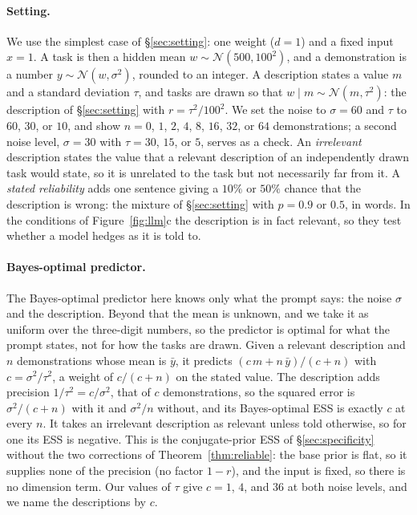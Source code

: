 \documentclass{article}
\begin{document}
\paragraph{Setting.} We use the simplest case of \S\ref{sec:setting}: one weight ($d = 1$) and a fixed input $x = 1$. A task is then a hidden mean $w \sim \mathcal{N}(500, 100^2)$, and a demonstration is a number $y \sim \mathcal{N}(w, \sigma^2)$, rounded to an integer. A description states a value $m$ and a standard deviation $\tau$, and tasks are drawn so that $w \mid m \sim \mathcal{N}(m, \tau^2)$: the description of \S\ref{sec:setting} with $r = \tau^2/100^2$. We set the noise to $\sigma = 60$ and $\tau$ to $60$, $30$, or $10$, and show $n = 0$, $1$, $2$, $4$, $8$, $16$, $32$, or $64$ demonstrations; a second noise level, $\sigma = 30$ with $\tau = 30$, $15$, or $5$, serves as a check. An \emph{irrelevant} description states the value that a relevant description of an independently drawn task would state, so it is unrelated to the task but not necessarily far from it. A \emph{stated reliability} adds one sentence giving a $10\%$ or $50\%$ chance that the description is wrong: the mixture of \S\ref{sec:setting} with $p = 0.9$ or $0.5$, in words. In the conditions of Figure~\ref{fig:llm}c the description is in fact relevant, so they test whether a model hedges as it is told to.

\paragraph{Bayes-optimal predictor.} The Bayes-optimal predictor here knows only what the prompt says: the noise $\sigma$ and the description. Beyond that the mean is unknown, and we take it as uniform over the three-digit numbers, so the predictor is optimal for what the prompt states, not for how the tasks are drawn. Given a relevant description and $n$ demonstrations whose mean is $\bar y$, it predicts $(c\,m + n\,\bar y)/(c + n)$ with $c = \sigma^2/\tau^2$, a weight of $c/(c+n)$ on the stated value. The description adds precision $1/\tau^2 = c/\sigma^2$, that of $c$ demonstrations, so the squared error is $\sigma^2/(c+n)$ with it and $\sigma^2/n$ without, and its Bayes-optimal ESS is exactly $c$ at every $n$. It takes an irrelevant description as relevant unless told otherwise, so for one its ESS is negative. This is the conjugate-prior ESS of \S\ref{sec:specificity} without the two corrections of Theorem~\ref{thm:reliable}: the base prior is flat, so it supplies none of the precision (no factor $1-r$), and the input is fixed, so there is no dimension term. Our values of $\tau$ give $c = 1$, $4$, and $36$ at both noise levels, and we name the descriptions by $c$.
\end{document}
